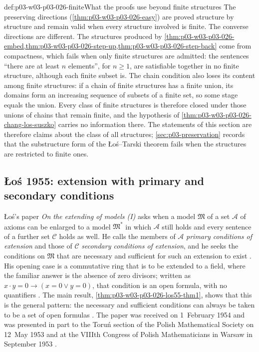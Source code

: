 \begin{hbwarning}{def:p03-w03-p03-026-finite}{What the proofs use beyond finite structures}
The preserving directions (\cref{thm:p03-w03-p03-026-easy}) are proved
structure by structure and remain valid when every structure involved is
finite.  The converse directions are different.  The structures produced by
\cref{thm:p03-w03-p03-026-embed,thm:p03-w03-p03-026-step-up,thm:p03-w03-p03-026-step-back}
come from compactness, which fails when only finite structures are admitted:
the sentences ``there are at least \(n\) elements'', for \(n\ge1\), are
satisfiable together in no finite structure, although each finite subset is.
The chain condition also loses its content among finite structures: if a
chain of finite structures has a finite union, its domains form an increasing
sequence of subsets of a finite set, so some stage equals the union.  Every
class of finite structures is therefore closed under those unions of chains
that remain finite, and the hypothesis of
\cref{thm:p03-w03-p03-026-chang-los-suszko} carries no information there.
The statements of this section are therefore claims about the class of all
structures; \cref{sec:p03-preservation} records that the substructure form of
the \L o\'s--Tarski theorem fails when the structures are restricted to
finite ones.
\end{hbwarning}

\subsection{\L o\'s 1955: extension with primary and secondary conditions}
\label{sec:p03-w03-p03-026-los1955}

\L o\'s's paper \emph{On the extending of models (I)} \cite{Los1955} asks
when a model \(\mathfrak M\) of a set \(\mathcal A\) of axioms can be enlarged
to a model \(\mathfrak M^*\) in which \(\mathcal A\) still holds and every
sentence of a further set \(\mathcal C\) holds as well.  He calls the members
of \(\mathcal A\) \emph{primary conditions of extension} and those of
\(\mathcal C\) \emph{secondary conditions of extension}, and he seeks the
conditions on \(\mathfrak M\) that are necessary and sufficient for such an
extension to exist \cite[p.~38]{Los1955}.  His opening case is a commutative
ring that is to be extended to a field, where the familiar answer is the
absence of zero divisors; written as
\(x\cdot y=0\to(x=0\lor y=0)\), that condition is an open formula, with no
quantifiers \cite[pp.~38--39]{Los1955}.  The main result,
\cref{thm:p03-w03-p03-026-los55-thm1}, shows that this is the general
pattern: the necessary and sufficient conditions can always be taken to be a
set of open formulas \cite[p.~39]{Los1955}.  The paper was received on
1~February 1954 and was presented in part to the Toru\'n section of the
Polish Mathematical Society on 12~May 1953 and at the VIIIth Congress of
Polish Mathematicians in Warsaw in September 1953
\cite[pp.~38, 54]{Los1955}.

